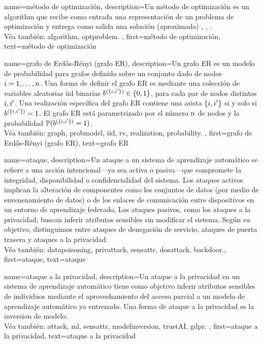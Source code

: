 {name={método de optimización},
	description={Un método de optimización es un \gls{algorithm} 
		que recibe como entrada una representación de un problema de optimización y entrega como salida 
		una solución (aproximada) \cite{BoydConvexBook}, \cite{nesterov04}, \cite{BertsekasNonLinProgr}.\\
		Véa también: \gls{algorithm}, \gls{optproblem}.
	},
	first={método de optimización},
	text={método de optimización}
}





{name={grafo de Erd\H{o}s-R\'enyi (grafo ER)},
	description={Un grafo ER es un modelo de probabilidad para grafos definido sobre 
		un conjunto dado de nodos $i=1,\ldots,n$. Una forma de definir el 
		grafo ER es mediante una colección de variables aleatorias iid binarias 
		$b^{(\{i,i'\})} \in \{0,1\}$, para cada par de nodos distintos 
		$i, i'$. Una realización específica del grafo ER contiene 
		una arista $\{i,i'\}$ si y solo si 
		$b^{(\{i,i'\})}=1$. El grafo ER está parametrizado por el 
		número $n$ de nodos y la probabilidad
		$\mathbb{P}({b^{(\{i,i'\})}=1})$.\\
		Véa también: \gls{graph}, \gls{probmodel}, \gls{iid}, \gls{rv}, \gls{realization}, \gls{probability}.
	},
	first={grafo de Erd\H{o}s-R\'enyi (grafo ER)},
	text={grafo ER}
}


{name={ataque},  
	description={Un ataque a un sistema de aprendizaje automático se refiere a una acción intencional—ya sea 
		activa o pasiva—que compromete la integridad, disponibilidad o confidencialidad del sistema. 
		Los ataques activos implican la alteración de componentes como los conjuntos de datos
		(por medio de envenenamiento de datos) o de los enlaces de comunicación entre dispositivos 
		en un entorno de aprendizaje federado. Los ataques pasivos, como los ataques a la privacidad, 
		buscan inferir atributos sensibles sin modificar el sistema. 
		Según su objetivo, distinguimos entre ataques de denegación de servicio, ataques de puerta trasera y ataques a la privacidad.\\
		Véa también: \gls{datapoisoning}, \gls{privattack}, \gls{sensattr}, \gls{dosattack}, \gls{backdoor}.}, 
	first={ataque},
	text={ataque}
}



{name={ataque a la privacidad},
	description={Un ataque a la privacidad en un sistema de aprendizaje automático
		tiene como objetivo inferir atributos sensibles de individuos mediante el aprovechamiento 
		del acceso parcial a un modelo de aprendizaje automático ya entrenado. 
		Una forma de ataque a la privacidad es la inversion de modelo.\\
		Véa también: \gls{attack}, \gls{ml}, \gls{sensattr}, \gls{modelinversion}, \gls{trustAI}, \gls{gdpr}.
	},
	first={ataque a la privacidad}, 
	text={ataque a la privacidad}
}


